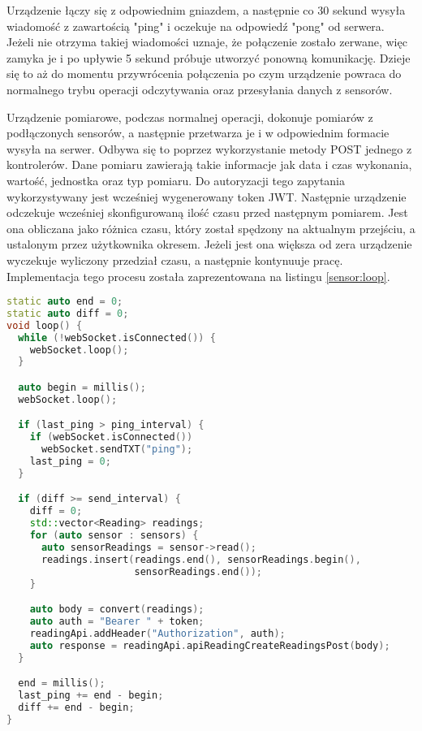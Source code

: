 Urządzenie łączy się z odpowiednim gniazdem, a następnie co 30
sekund wysyła wiadomość z zawartością "ping" i oczekuje na odpowiedź "pong" od serwera.
Jeżeli nie otrzyma takiej wiadomości uznaje, że połączenie zostało zerwane, więc zamyka je
i po upływie 5 sekund próbuje utworzyć ponowną komunikację. Dzieje się to aż do momentu przywrócenia
połączenia po czym urządzenie powraca do normalnego trybu operacji odczytywania oraz
przesyłania danych z sensorów.

Urządzenie pomiarowe, podczas normalnej operacji, dokonuje pomiarów z podłączonych sensorów, 
a następnie przetwarza je i w odpowiednim formacie wysyła na serwer. Odbywa się to poprzez
wykorzystanie metody POST jednego z kontrolerów. Dane pomiaru zawierają takie informacje jak
data i czas wykonania, wartość, jednostka oraz typ pomiaru. Do autoryzacji tego zapytania
wykorzystywany jest wcześniej wygenerowany token JWT. Następnie urządzenie odczekuje wcześniej
skonfigurowaną ilość czasu przed następnym pomiarem. Jest ona obliczana jako różnica czasu, który
został spędzony na aktualnym przejściu, a ustalonym przez użytkownika okresem. Jeżeli jest ona
większa od zera urządzenie wyczekuje wyliczony przedział czasu, a następnie kontynuuje pracę.
Implementacja tego procesu została zaprezentowana na listingu \ref{sensor:loop}.
\begin{lstlisting}[language={C++},caption={Główna pętla urządzenia pomiarowego},label={sensor:loop},captionpos=b]
static auto end = 0;
static auto diff = 0;
void loop() {
  while (!webSocket.isConnected()) {
    webSocket.loop();
  }

  auto begin = millis();
  webSocket.loop();

  if (last_ping > ping_interval) {
    if (webSocket.isConnected())
      webSocket.sendTXT("ping");
    last_ping = 0;
  }

  if (diff >= send_interval) {
    diff = 0;
    std::vector<Reading> readings;
    for (auto sensor : sensors) {
      auto sensorReadings = sensor->read();
      readings.insert(readings.end(), sensorReadings.begin(),
                      sensorReadings.end());
    }

    auto body = convert(readings);
    auto auth = "Bearer " + token;
    readingApi.addHeader("Authorization", auth);
    auto response = readingApi.apiReadingCreateReadingsPost(body);
  }

  end = millis();
  last_ping += end - begin;
  diff += end - begin;
}
\end{lstlisting}

